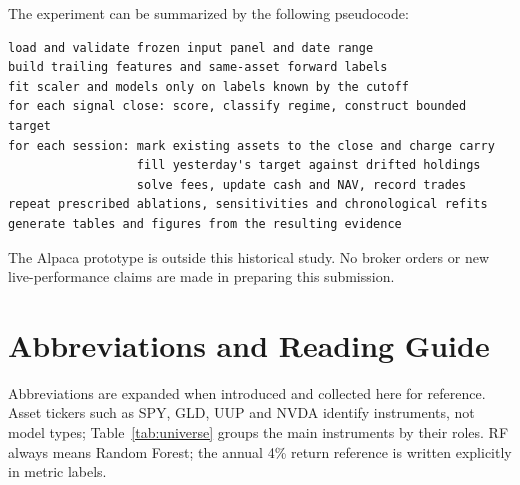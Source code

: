 \documentclass[3p,times]{elsarticle}
\begin{document}
The experiment can be summarized by the following pseudocode:
\begin{verbatim}
load and validate frozen input panel and date range
build trailing features and same-asset forward labels
fit scaler and models only on labels known by the cutoff
for each signal close: score, classify regime, construct bounded target
for each session: mark existing assets to the close and charge carry
                  fill yesterday's target against drifted holdings
                  solve fees, update cash and NAV, record trades
repeat prescribed ablations, sensitivities and chronological refits
generate tables and figures from the resulting evidence
\end{verbatim}
The Alpaca prototype is outside this historical study. No broker orders or new live-performance claims are made in preparing this submission.
\clearpage
\section{Abbreviations and Reading Guide}\label{app:abbreviations}
Abbreviations are expanded when introduced and collected here for reference. Asset tickers such as SPY, GLD, UUP and NVDA identify instruments, not model types; Table~\ref{tab:universe} groups the main instruments by their roles. RF always means Random Forest; the annual 4\% return reference is written explicitly in metric labels.
\end{document}

